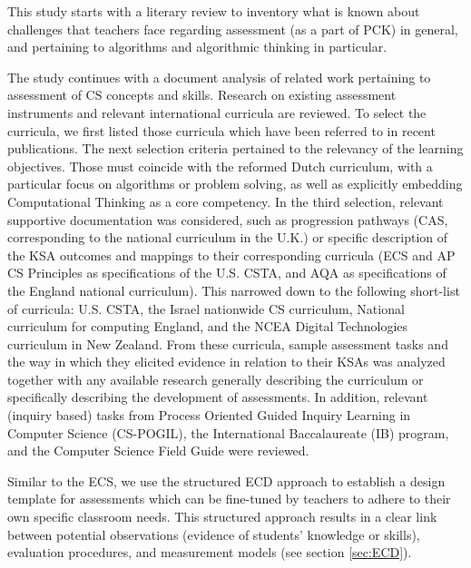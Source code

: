 This study starts with a literary review to inventory what is known about challenges that teachers face regarding assessment (as a part of PCK) in general, and pertaining to algorithms and algorithmic thinking in particular.


The study continues with a document analysis of related work pertaining to assessment of CS concepts and skills. Research on existing assessment instruments and relevant international curricula are reviewed. To select the curricula, we first listed those curricula which have been referred to in recent publications. The next selection criteria pertained to the relevancy of the learning objectives. Those must coincide with the reformed Dutch curriculum, with a particular focus on algorithms or problem solving, as well as explicitly embedding Computational Thinking as a core competency. In the third selection, relevant supportive documentation was considered, such as progression pathways (CAS, corresponding to the national curriculum in the U.K.) or specific description of the KSA outcomes and mappings to their corresponding curricula (ECS and AP CS Principles as specifications of the U.S. CSTA, and AQA as specifications of the England national curriculum). This narrowed down to the following short-list of curricula: U.S. CSTA, the Israel nationwide CS curriculum, National curriculum for computing England, and the NCEA Digital Technologies curriculum in New Zealand. From these curricula, sample assessment tasks and the way in which they elicited evidence in relation to their KSAs was analyzed together with any available research generally describing the curriculum or specifically describing the development of assessments. In addition, relevant (inquiry based) tasks from Process Oriented Guided Inquiry Learning in Computer Science (CS-POGIL), the International Baccalaureate (IB) program, and the Computer Science Field Guide \cite{CSFieldGuide} were reviewed.


Similar to the ECS, we use the structured ECD approach to establish a design template for assessments which can be fine-tuned by teachers to adhere to their own specific classroom needs. This structured approach results in a clear link between potential observations (evidence of students' knowledge or skills), evaluation procedures, and measurement models (see section \ref{sec:ECD}).


